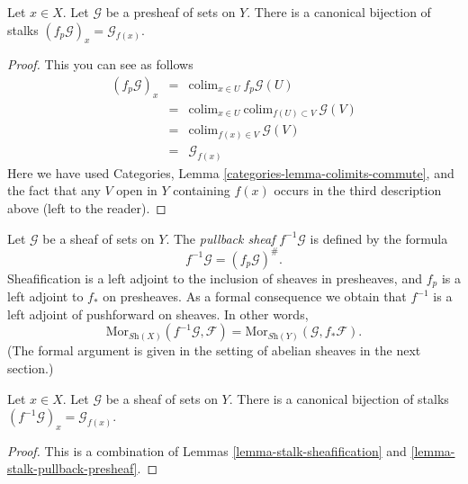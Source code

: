 \begin{lemma}
\label{lemma-stalk-pullback-presheaf}
Let $x \in X$. Let $\mathcal{G}$ be a presheaf of sets on $Y$.
There is a canonical bijection of stalks
$(f_p\mathcal{G})_x = \mathcal{G}_{f(x)}$.
\end{lemma}

\begin{proof}
This you can see as follows
\begin{eqnarray*}
(f_p\mathcal{G})_x
& = &
\text{colim}_{x \in U}\ f_p\mathcal{G}(U) \\
& = &
\text{colim}_{x \in U}\ \text{colim}_{f(U) \subset V}\ \mathcal{G}(V) \\
& = &
\text{colim}_{f(x) \in V}\ \mathcal{G}(V) \\
& = &
\mathcal{G}_{f(x)}
\end{eqnarray*}
Here we have used
Categories, Lemma \ref{categories-lemma-colimits-commute},
and the fact that any $V$ open in $Y$ containing $f(x)$
occurs in the third description above (left to the reader).
\end{proof}

\noindent
Let $\mathcal{G}$ be a sheaf of sets on $Y$.
The {\it pullback sheaf} $f^{-1}\mathcal{G}$ is defined
by the formula
$$
f^{-1}\mathcal{G} = (f_p\mathcal{G})^\# .
$$
Sheafification is a left adjoint to the inclusion
of sheaves in presheaves, and $f_p$ is a left
adjoint to $f_*$ on presheaves. As a formal consequence
we obtain that $f^{-1}$ is a left adjoint of
pushforward on sheaves. In other words,
$$
\text{Mor}_{\textit{Sh}(X)}(f^{-1}\mathcal{G}, \mathcal{F})
=
\text{Mor}_{\textit{Sh}(Y)}(\mathcal{G}, f_*\mathcal{F}).
$$
(The formal argument is given in the setting of abelian
sheaves in the next section.)

\begin{lemma}
\label{lemma-stalk-pullback}
Let $x \in X$. Let $\mathcal{G}$ be a sheaf of sets on $Y$.
There is a canonical bijection of stalks
$(f^{-1}\mathcal{G})_x = \mathcal{G}_{f(x)}$.
\end{lemma}

\begin{proof}
This is a combination of Lemmas \ref{lemma-stalk-sheafification}
and \ref{lemma-stalk-pullback-presheaf}.
\end{proof}

